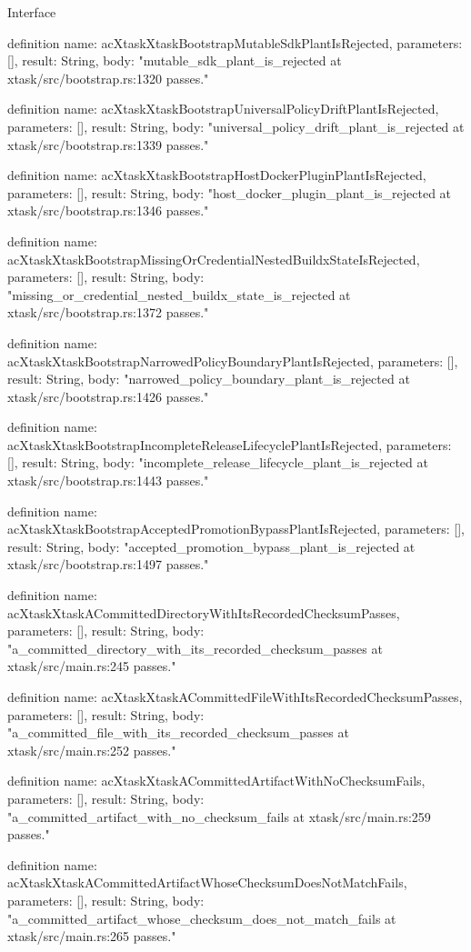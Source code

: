 \begin{lexlean}{Interface}
\begin{semanticmodule}
definition{
  name: acXtaskXtaskBootstrapMutableSdkPlantIsRejected,
  parameters: [],
  result: String,
  body: "mutable_sdk_plant_is_rejected at xtask/src/bootstrap.rs:1320 passes."
}

definition{
  name: acXtaskXtaskBootstrapUniversalPolicyDriftPlantIsRejected,
  parameters: [],
  result: String,
  body: "universal_policy_drift_plant_is_rejected at xtask/src/bootstrap.rs:1339 passes."
}

definition{
  name: acXtaskXtaskBootstrapHostDockerPluginPlantIsRejected,
  parameters: [],
  result: String,
  body: "host_docker_plugin_plant_is_rejected at xtask/src/bootstrap.rs:1346 passes."
}

definition{
  name: acXtaskXtaskBootstrapMissingOrCredentialNestedBuildxStateIsRejected,
  parameters: [],
  result: String,
  body: "missing_or_credential_nested_buildx_state_is_rejected at xtask/src/bootstrap.rs:1372 passes."
}

definition{
  name: acXtaskXtaskBootstrapNarrowedPolicyBoundaryPlantIsRejected,
  parameters: [],
  result: String,
  body: "narrowed_policy_boundary_plant_is_rejected at xtask/src/bootstrap.rs:1426 passes."
}

definition{
  name: acXtaskXtaskBootstrapIncompleteReleaseLifecyclePlantIsRejected,
  parameters: [],
  result: String,
  body: "incomplete_release_lifecycle_plant_is_rejected at xtask/src/bootstrap.rs:1443 passes."
}

definition{
  name: acXtaskXtaskBootstrapAcceptedPromotionBypassPlantIsRejected,
  parameters: [],
  result: String,
  body: "accepted_promotion_bypass_plant_is_rejected at xtask/src/bootstrap.rs:1497 passes."
}

definition{
  name: acXtaskXtaskACommittedDirectoryWithItsRecordedChecksumPasses,
  parameters: [],
  result: String,
  body: "a_committed_directory_with_its_recorded_checksum_passes at xtask/src/main.rs:245 passes."
}

definition{
  name: acXtaskXtaskACommittedFileWithItsRecordedChecksumPasses,
  parameters: [],
  result: String,
  body: "a_committed_file_with_its_recorded_checksum_passes at xtask/src/main.rs:252 passes."
}

definition{
  name: acXtaskXtaskACommittedArtifactWithNoChecksumFails,
  parameters: [],
  result: String,
  body: "a_committed_artifact_with_no_checksum_fails at xtask/src/main.rs:259 passes."
}

definition{
  name: acXtaskXtaskACommittedArtifactWhoseChecksumDoesNotMatchFails,
  parameters: [],
  result: String,
  body: "a_committed_artifact_whose_checksum_does_not_match_fails at xtask/src/main.rs:265 passes."
}


\end{semanticmodule}
\end{lexlean}
